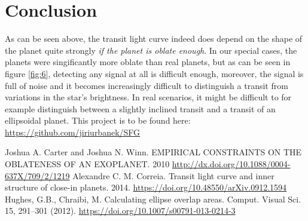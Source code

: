 \documentclass[10pt]{article}
\numberwithin{equation}{subsection}
\begin{document}
\section{Conclusion}
As can be seen above, the transit light curve indeed does depend on the shape of the planet
quite strongly \emph{if the planet is oblate enough}. In our special cases, the planets
were singificantly more oblate than real planets, but as can be seen in figure \ref{fig:6},
detecting any signal at all is difficult enough, moreover, the signal is full of noise
and it becomes increasingly difficult to distinguish a transit from variations in the star's
brightness. In real scenarios, it might be difficult to for example distinguish between
a slightly inclined transit and a transit of an ellipsoidal planet.
This project is to be found here: \url{https://github.com/jiriurbanek/SFG}
\begin{thebibliography}{5}
   Joshua A. Carter and Joshua N. Winn. EMPIRICAL CONSTRAINTS ON THE OBLATENESS OF AN EXOPLANET. 2010 \url{http://dx.doi.org/10.1088/0004-637X/709/2/1219}
   Alexandre C. M. Correia. Transit light curve and inner structure of close-in planets. 2014. \url{https://doi.org/10.48550/arXiv.0912.1594}
   Hughes, G.B., Chraibi, M. Calculating ellipse overlap areas. Comput. Visual Sci. 15, 291–301 (2012). \url{https://doi.org/10.1007/s00791-013-0214-3}
\end{thebibliography}
\end{document}
